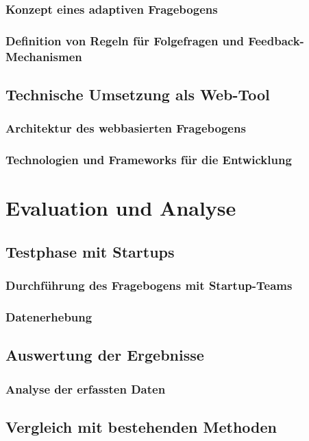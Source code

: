 \subsection{Konzept eines adaptiven Fragebogens}
\subsection{Definition von Regeln für Folgefragen und Feedback-Mechanismen}

\section{Technische Umsetzung als Web-Tool}
\subsection{Architektur des webbasierten Fragebogens}
\subsection{Technologien und Frameworks für die Entwicklung}

\chapter{Evaluation und Analyse}

\section{Testphase mit Startups}
\subsection{Durchführung des Fragebogens mit Startup-Teams}
\subsection{Datenerhebung}

\section{Auswertung der Ergebnisse}
\subsection{Analyse der erfassten Daten}

\section{Vergleich mit bestehenden Methoden}
